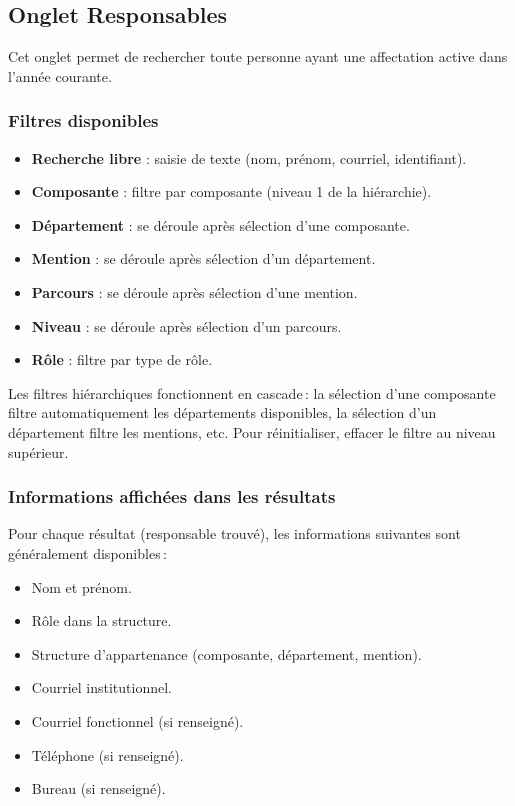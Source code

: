 \subsection{Onglet Responsables}

Cet onglet permet de rechercher toute personne ayant une affectation active dans l'ann\'ee courante.

\subsubsection{Filtres disponibles}

\begin{itemize}
  \item \textbf{Recherche libre} : saisie de texte (nom, pr\'enom, courriel, identifiant).
  \item \textbf{Composante} : filtre par composante (niveau 1 de la hi\'erarchie).
  \item \textbf{D\'epartement} : se d\'eroule apr\`es s\'election d'une composante.
  \item \textbf{Mention} : se d\'eroule apr\`es s\'election d'un d\'epartement.
  \item \textbf{Parcours} : se d\'eroule apr\`es s\'election d'une mention.
  \item \textbf{Niveau} : se d\'eroule apr\`es s\'election d'un parcours.
  \item \textbf{R\^ole} : filtre par type de r\^ole.
\end{itemize}

\begin{notebox}
  Les filtres hi\'erarchiques fonctionnent en cascade\,: la s\'election d'une composante filtre automatiquement les d\'epartements disponibles, la s\'election d'un d\'epartement filtre les mentions, etc. Pour r\'einitialiser, effacer le filtre au niveau sup\'erieur.
\end{notebox}

\subsubsection{Informations affich\'ees dans les r\'esultats}

Pour chaque r\'esultat (responsable trouv\'e), les informations suivantes sont g\'en\'eralement disponibles\,:
\begin{itemize}
  \item Nom et pr\'enom.
  \item R\^ole dans la structure.
  \item Structure d'appartenance (composante, d\'epartement, mention).
  \item Courriel institutionnel.
  \item Courriel fonctionnel (si renseign\'e).
  \item T\'el\'ephone (si renseign\'e).
  \item Bureau (si renseign\'e).
\end{itemize}

